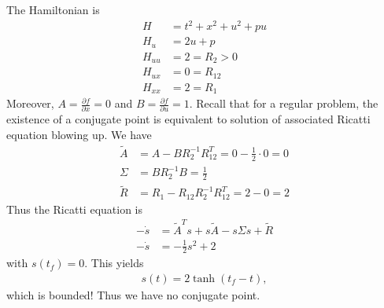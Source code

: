 \documentclass[12pt]{article}
\begin{document}
\begin{problem}[4]
The Hamiltonian is
\begin{align*}
	H &= t^2 + x^2 + u^2 + pu\\
	H_u &= 2u+p \\
	H_{uu} &= 2 = R_2 >0\\
	H_{ux} &= 0 = R_{12} \\
	H_{x x} &= 2 = R_1 
\end{align*}
Moreover, $ A = \frac{\partial f}{\partial x} =0 $ and $ B = \frac{\partial f}{\partial u} =1$. Recall that for a regular problem, the existence of a conjugate point is equivalent to solution of associated Ricatti equation blowing up. We have
\begin{align*}
	\widetilde{ A} &= A - BR_2^{-1}R_{12}^{T} = 0- \frac{1}{2} \cdot 0 = 0 \\
	\Sigma &= BR_2^{-1}B = \frac{1}{2}\\
	\widetilde{ R} &= R_1- R_{12} R_2^{-1} R_{12}^{T} = 2-0 = 2 
\end{align*}
Thus the Ricatti equation is
\begin{align*}
	-\dot{s} &= \widetilde{ A} ^{T} s + s\widetilde{ A} - s \Sigma s + \widetilde{ R}\\
	-\dot{s} &= -\frac{1}{2} s ^2 + 2
\end{align*}
with $ s(t_f) = 0$. This yields
 \begin{align*}
	s(t) = 2 \tanh(t_f -t), 
\end{align*}
which is bounded! Thus we have no conjugate point.
\end{problem}
\end{document}
